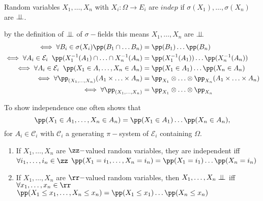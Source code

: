 \documentclass[../main.tex]{subfiles}
\begin{document}
\begin{definition}
  Random variables $X_1, \ldots, X_n$ with $X_i \colon \Omega \to E_i$ are $indep$ if
  $\sigma(X_1), \ldots, \sigma(X_n)$ are $\perp\!\!\!\!\,\perp$.
\end{definition}

\begin{remark}
    by the definition of $\perp\!\!\!\!\,\perp$ of $\sigma-$fields this means $X_1, \ldots, X_n$ are $\perp\!\!\!\!\,\perp$
    \begin{align*}
     \iff
    \forall B_i \in \sigma(X_i)\pp(B_1 \cap
    \ldots B_n) &= \pp(B_1) \ldots \pp(B_n) \\ 
    \iff
       \forall A_i \in \mathcal{E}_i \;\; \pp(X_1^{-1}(A_1) \cap \ldots
    \cap X_n^{-1}(A_n) &= \pp(X_1^{-1}(A_1)) \ldots \pp(X_n^{-1}(A_n)) \\
    \iff
    \forall A_i \in \mathcal{E}_i \;\;\pp(X_1 \in A, \ldots, X_n \in A_n) &= \pp(X_1 \in
    A_1)\ldots\pp(X_n \in A_n) \\
    \iff 
    \forall \pp_{(X_1, \ldots, X_n)}(A_1 \times \ldots \times A_n) &= \pp_{X_1} \otimes \ldots \otimes \pp_{X_n} (A_1 \times
    \ldots \times A_n) \\
    \iff 
    \forall \pp_{(X_1, \ldots, X_n)} &= \pp_{X_1} \otimes \ldots \otimes \pp_{X_n}
    \end{align*}
\end{remark}
\begin{remark}
    To show independence one often shows that
    \[
    \pp(X_1 \in A_1, \ldots, X_n \in A_n ) = \pp(X_1 \in A_1) \ldots \pp(X_n \in A_n)
    ,\] 
    for $A_i \in \mathcal{C}_i$ with $\mathcal{C}_i$ a generating $\pi-$system of
  $\mathcal{E}_i$ containing $\Omega$.
\end{remark}

\begin{corollary}
  \hfill
  \begin{enumerate}
    \item If $X_1, \ldots, X_n$ are $\zz-$valued random variables, they are independent iff
      $\forall i_1, \ldots, i_n \in \zz$ $\pp(X_1 = i_1, \ldots, X_n = i_n) = \pp(X_1 = i_1)
      \ldots \pp(X_n = i_n)$
    \item If $X_1, \ldots, X_n$ are $\rr-$valued random variables, then $X_1,\ldots, X_n
      \perp\!\!\!\!\,\perp$ iff $\forall x_1, \ldots, x_n \in \rr$ $\pp(X_1 \leq x_1, \ldots, X_n \leq x_n) =
      \pp(X_1 \leq x_1) \ldots \pp(X_n \leq x_n)$
  \end{enumerate}
\end{corollary}
\end{document}
